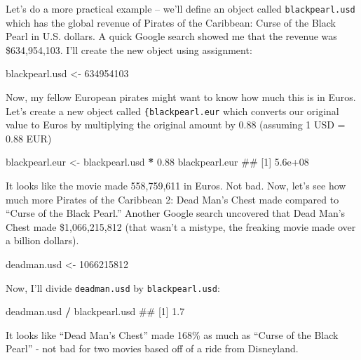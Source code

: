 \documentclass[]{book}
\newenvironment{Shaded}{\begin{snugshade}}{\end{snugshade}}
\newcommand{\DecValTok}[1]{\textcolor[rgb]{0.00,0.00,0.81}{#1}}
\newcommand{\FloatTok}[1]{\textcolor[rgb]{0.00,0.00,0.81}{#1}}
\newcommand{\StringTok}[1]{\textcolor[rgb]{0.31,0.60,0.02}{#1}}
\newcommand{\OperatorTok}[1]{\textcolor[rgb]{0.81,0.36,0.00}{\textbf{#1}}}
\newcommand{\NormalTok}[1]{#1}
\theoremstyle{definition}
\theoremstyle{definition}
\theoremstyle{remark}
\begin{document}
Let's do a more practical example -- we'll define an object called
\texttt{blackpearl.usd} which has the global revenue of Pirates of the
Caribbean: Curse of the Black Pearl in U.S. dollars. A quick Google
search showed me that the revenue was \$634,954,103. I'll create the new
object using assignment:

\begin{Shaded}
\begin{Highlighting}[]
\NormalTok{blackpearl.usd <-}\StringTok{ }\DecValTok{634954103}
\end{Highlighting}
\end{Shaded}

Now, my fellow European pirates might want to know how much this is in
Euros. Let's create a new object called \texttt{\{blackpearl.eur} which
converts our original value to Euros by multiplying the original amount
by 0.88 (assuming 1 USD = 0.88 EUR)

\begin{Shaded}
\begin{Highlighting}[]
\NormalTok{blackpearl.eur <-}\StringTok{ }\NormalTok{blackpearl.usd }\OperatorTok{*}\StringTok{ }\FloatTok{0.88}
\NormalTok{blackpearl.eur}
\NormalTok{## [1] 5.6e+08}
\end{Highlighting}
\end{Shaded}

It looks like the movie made 558,759,611 in Euros. Not bad. Now, let's
see how much more Pirates of the Caribbean 2: Dead Man's Chest made
compared to ``Curse of the Black Pearl.'' Another Google search
uncovered that Dead Man's Chest made \$1,066,215,812 (that wasn't a
mistype, the freaking movie made over a billion dollars).

\begin{Shaded}
\begin{Highlighting}[]
\NormalTok{deadman.usd <-}\StringTok{ }\DecValTok{1066215812}
\end{Highlighting}
\end{Shaded}

Now, I'll divide \texttt{deadman.usd} by \texttt{blackpearl.usd}:

\begin{Shaded}
\begin{Highlighting}[]
\NormalTok{deadman.usd }\OperatorTok{/}\StringTok{ }\NormalTok{blackpearl.usd}
\NormalTok{## [1] 1.7}
\end{Highlighting}
\end{Shaded}

It looks like ``Dead Man's Chest'' made 168\% as much as ``Curse of the
Black Pearl'' - not bad for two movies based off of a ride from
Disneyland.
\end{document}
